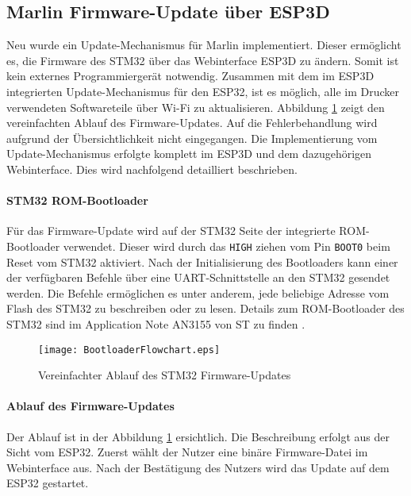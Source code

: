 \subsection{Marlin Firmware-Update über ESP3D}
\label{sec:MarlinFirmwareUpdateüberESP3D}

Neu wurde ein Update-Mechanismus für Marlin implementiert. Dieser ermöglicht es, die Firmware des STM32 über das Webinterface ESP3D zu ändern. Somit ist kein externes Programmiergerät notwendig. Zusammen mit dem im ESP3D integrierten Update-Mechanismus für den ESP32, ist es möglich, alle im Drucker verwendeten Softwareteile über Wi-Fi zu aktualisieren. Abbildung \ref{pic:BootloaderFlowchart} zeigt den vereinfachten Ablauf des Firmware-Updates. Auf die Fehlerbehandlung wird aufgrund der Übersichtlichkeit nicht eingegangen. Die Implementierung vom Update-Mechanismus erfolgte komplett im ESP3D und dem dazugehörigen Webinterface. Dies wird nachfolgend detailliert beschrieben.

\paragraph{STM32 ROM-Bootloader}
Für das Firmware-Update wird auf der STM32 Seite der integrierte ROM-Bootloader verwendet. Dieser wird durch das \texttt{HIGH} ziehen vom Pin \texttt{BOOT0} beim Reset vom STM32 aktiviert. Nach der Initialisierung des Bootloaders kann einer der verfügbaren Befehle über eine UART-Schnittstelle an den STM32 gesendet werden. Die Befehle ermöglichen es unter anderem, jede beliebige Adresse vom Flash des STM32 zu beschreiben oder zu lesen. Details zum ROM-Bootloader des STM32 sind im Application Note AN3155 von ST zu finden \cite{AN3155}.

\begin{figure}[h!]
	\centering
	\texttt{[image: BootloaderFlowchart.eps]}
	\caption{Vereinfachter Ablauf des STM32 Firmware-Updates}
	\label{pic:BootloaderFlowchart}
\end{figure}

\paragraph{Ablauf des Firmware-Updates}
Der Ablauf ist in der Abbildung \ref{pic:BootloaderFlowchart} ersichtlich. Die Beschreibung erfolgt aus der Sicht vom ESP32. Zuerst wählt der Nutzer eine binäre Firmware-Datei im Webinterface aus. Nach der Bestätigung des Nutzers wird das Update auf dem ESP32 gestartet.

